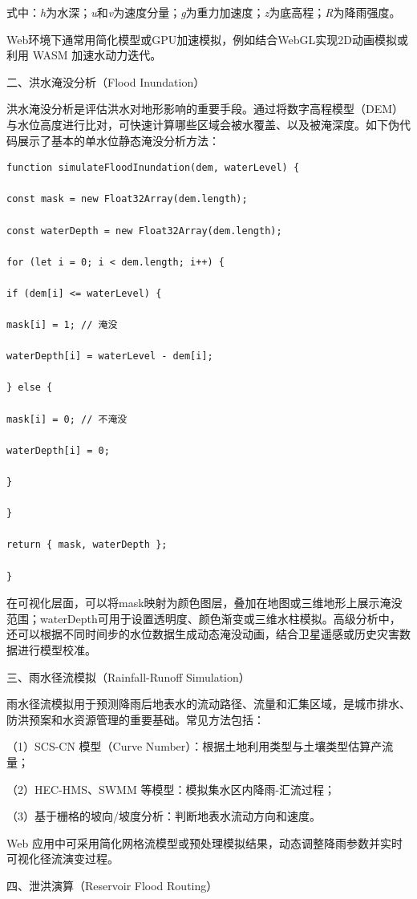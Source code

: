 式中：\emph{h}为水深；\emph{u}和\emph{v}为速度分量；\emph{g}为重力加速度；\emph{z}为底高程；\emph{R}为降雨强度。

Web环境下通常用简化模型或GPU加速模拟，例如结合WebGL实现2D动画模拟或利用 WASM 加速水动力迭代。

二、洪水淹没分析（Flood Inundation）

洪水淹没分析是评估洪水对地形影响的重要手段。通过将数字高程模型（DEM）与水位高度进行比对，可快速计算哪些区域会被水覆盖、以及被淹深度。如下伪代码展示了基本的单水位静态淹没分析方法：

\begin{verbatim}
function simulateFloodInundation(dem, waterLevel) {

const mask = new Float32Array(dem.length);

const waterDepth = new Float32Array(dem.length);

for (let i = 0; i < dem.length; i++) {

if (dem[i] <= waterLevel) {

mask[i] = 1; // 淹没

waterDepth[i] = waterLevel - dem[i];

} else {

mask[i] = 0; // 不淹没

waterDepth[i] = 0;

}

}

return { mask, waterDepth };

}
\end{verbatim}

在可视化层面，可以将mask映射为颜色图层，叠加在地图或三维地形上展示淹没范围；waterDepth可用于设置透明度、颜色渐变或三维水柱模拟。高级分析中，还可以根据不同时间步的水位数据生成动态淹没动画，结合卫星遥感或历史灾害数据进行模型校准。

三、雨水径流模拟（Rainfall-Runoff Simulation）

雨水径流模拟用于预测降雨后地表水的流动路径、流量和汇集区域，是城市排水、防洪预案和水资源管理的重要基础。常见方法包括：

（1）SCS-CN 模型（Curve Number）：根据土地利用类型与土壤类型估算产流量；

（2）HEC-HMS、SWMM 等模型：模拟集水区内降雨-汇流过程；

（3）基于栅格的坡向/坡度分析：判断地表水流动方向和速度。

Web 应用中可采用简化网格流模型或预处理模拟结果，动态调整降雨参数并实时可视化径流演变过程。

四、泄洪演算（Reservoir Flood Routing）

